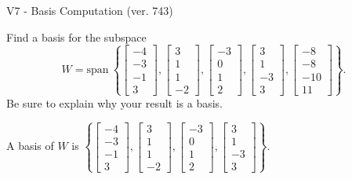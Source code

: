 \begin{exercise}
  \begin{exerciseTitle}V7 - Basis Computation (ver. 743)\end{exerciseTitle}
  \begin{exerciseStatement}
    Find a basis for the subspace 
\[W=\mathrm{span}\ \left\{\left[\begin{array}{r}
-4 \\
-3 \\
-1 \\
3
\end{array}\right] , \left[\begin{array}{r}
3 \\
1 \\
1 \\
-2
\end{array}\right] , \left[\begin{array}{r}
-3 \\
0 \\
1 \\
2
\end{array}\right] , \left[\begin{array}{r}
3 \\
1 \\
-3 \\
3
\end{array}\right] , \left[\begin{array}{r}
-8 \\
-8 \\
-10 \\
11
\end{array}\right]\right\}.\]
 Be sure to explain why your result is a basis.


  \end{exerciseStatement}
  \begin{exerciseAnswer}
   A basis of \(W\) is  \(\left\{\left[\begin{array}{r}
-4 \\
-3 \\
-1 \\
3
\end{array}\right] , \left[\begin{array}{r}
3 \\
1 \\
1 \\
-2
\end{array}\right] , \left[\begin{array}{r}
-3 \\
0 \\
1 \\
2
\end{array}\right] , \left[\begin{array}{r}
3 \\
1 \\
-3 \\
3
\end{array}\right]\right\}\).
  


  \end{exerciseAnswer}
\end{exercise}